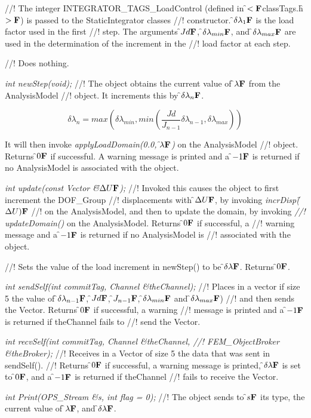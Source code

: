 //! The integer INTEGRATOR\_TAGS\_LoadControl (defined in
\f$<{\bf F}$classTags.h\f$>{\bf F}$) is passed to the StaticIntegrator classes
//! constructor. \f$\delta \lambda_1{\bf F}$ is the load factor used in the first
//! step. The arguments \f$Jd{\bf F}$, \f$\delta \lambda_{min}{\bf F}$, and \f$\delta
\lambda_{max}{\bf F}$ are used in the determination of the increment in the
//! load factor at each step.



//! Does nothing.


{\em int newStep(void);}
//! The object obtains the current value of \f$\lambda{\bf F}$ from the AnalysisModel
//! object. It increments this by \f$\delta \lambda_n {\bf F}$.

\[ 
\delta \lambda_n = max \left( \delta \lambda_{min}, min \left(
\frac{Jd}{J_{n-1}} \delta \lambda_{n-1}, \delta \lambda_{max} \right) \right)
\]

\noindent It will then invoke
{\em applyLoadDomain(0.0, \f$\lambda{\bf F}$)} on the AnalysisModel
//! object. Returns \f$0{\bf F}$ if successful. A warning message is printed and a
\f$-1{\bf F}$ is returned if no AnalysisModel is associated with the object.

{\em int update(const Vector \&\f$\Delta U{\bf F}$);}
//! Invoked this causes the object to first increment the DOF\_Group
//! displacements with \f$\Delta U{\bf F}$, by invoking {\em incrDisp(\f$\Delta U){\bf F}$}
//! on the AnalysisModel, and then to update the domain, by invoking {\em
//! updateDomain()} on the AnalysisModel. Returns \f$0{\bf F}$ if successful, a
//! warning message and a \f$-1{\bf F}$ is returned if no AnalysisModel is
//! associated with the object.


//! Sets the value of the load increment in newStep() to be \f$\delta
\lambda{\bf F}$. Returns \f$0{\bf F}$.

{\em int sendSelf(int commitTag, Channel \&theChannel); } 
//! Places in a vector if size 5 the value of \f$\delta \lambda_{n-1}{\bf F}$,
\f$Jd{\bf F}$, \f$J_{n-1}{\bf F}$, \f$\delta \lambda_{min}{\bf F}$ and \f$\delta \lambda_{max}{\bf F}$)
//! and then sends the Vector. Returns \f$0{\bf F}$ if successful, a warning
//! message is printed and a \f$-1{\bf F}$ is returned if \p theChannel fails to
//! send the Vector. 

{\em int recvSelf(int commitTag, Channel \&theChannel, 
//! FEM\_ObjectBroker \&theBroker); } 
//! Receives in a Vector of size 5 the data that was sent in sendSelf().
//! Returns \f$0{\bf F}$ if successful, a warning message is printed, \f$\delta
\lambda{\bf F}$ is set to \f$0{\bf F}$, and a \f$-1{\bf F}$ is returned if \p theChannel 
//! fails to receive the Vector.

{\em int Print(OPS\_Stream \&s, int flag = 0);}
//! The object sends to \f$s{\bf F}$ its type, the current value of \f$\lambda{\bf F}$, and
\f$\delta \lambda{\bf F}$. 
